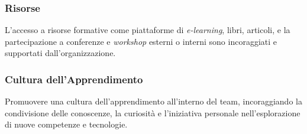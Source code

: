 \subsubsection{Risorse}
L'accesso a risorse formative come piattaforme di \textit{e-learning}, libri,
articoli, e la partecipazione a conferenze e \textit{workshop} esterni o interni
sono incoraggiati e supportati dall'organizzazione.

\subsubsection{Cultura dell'Apprendimento}
Promuovere una cultura dell'apprendimento all'interno del team, incoraggiando
la condivisione delle conoscenze, la curiosità e l'iniziativa personale
nell'esplorazione di nuove competenze e tecnologie.
